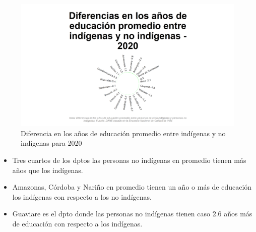     \begin{figure}[H]
        \caption{Diferencia en los años de educación promedio entre indígenas y no indígenas para 2020 \label{map_result_2} }
        \begin{center}
        \includegraphics[width=\textwidth,keepaspectratio]{img/var_123_static.png}
        \end{center}
    \end{figure}
            \begin{itemize}
                \item Tres cuartos de los dptos las personas no indígenas en promedio tienen más años que los indígenas.
                \item Amazonas, Córdoba y Nariño en promedio tienen un año o más de educación los indígenas con respecto a los no indígenas.
                \item Guaviare es el dpto donde las personas no indígenas tienen caso 2.6 años más de educación con respecto a los indígenas.
                \end{itemize}

